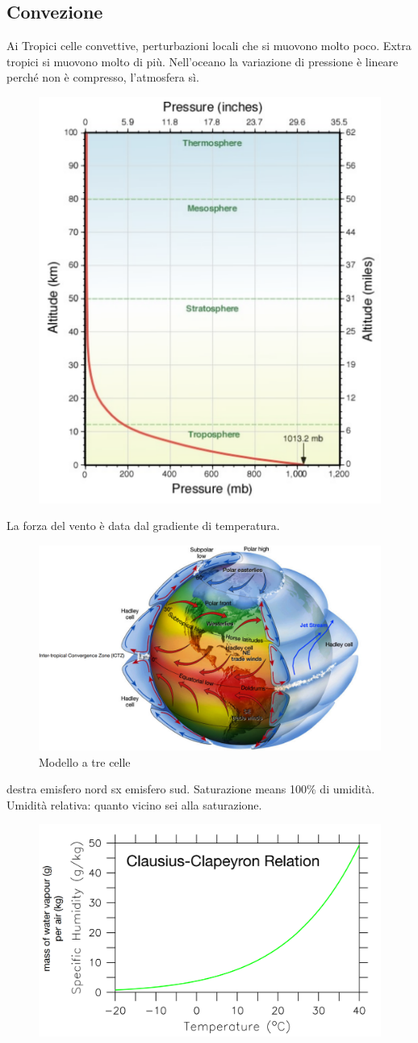 \subsection{Convezione}
Ai Tropici celle convettive, perturbazioni locali che si muovono molto poco. Extra tropici si muovono molto di più. Nell'oceano la variazione di pressione è lineare perché non è compresso, l'atmosfera sì.
\begin{figure}[htpb]
    \centering
    \includegraphics[width=0.35\linewidth]{uploads/pressure.png}
\end{figure}
La forza del vento è data dal gradiente di temperatura.
\begin{figure}[htpb]
    \centering
    \includegraphics[width=0.5\linewidth]{uploads/modello a tre celle.png}
    \caption{Modello a tre celle}
    \label{fig:mod a tre celle}
\end{figure}
destra emisfero nord sx emisfero sud. Saturazione means 100\% di umidità. Umidità relativa: quanto vicino sei alla saturazione.

\begin{figure}[htpb]
    \centering
    \includegraphics[width=0.5\linewidth]{uploads/CC equation.png}
\end{figure}

